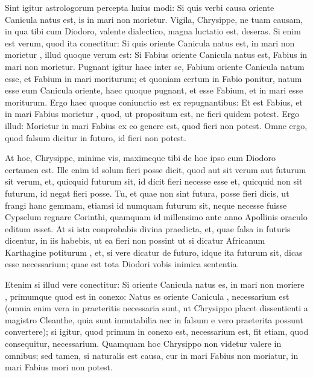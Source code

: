  Sint igitur astrologorum percepta huius modi: Si quis verbi causa oriente Canicula natus est, is in mari non morietur. Vigila, Chrysippe, ne tuam causam, in qua tibi cum Diodoro, valente dialectico, magna luctatio est, deseras. Si enim est verum, quod ita conectitur: Si quis oriente Canicula natus est, in mari non morietur , illud quoque verum est: Si Fabius oriente Canicula natus est, Fabius in mari non morietur. Pugnant igitur haec inter se, Fabium oriente Canicula natum esse, et Fabium in mari moriturum; et quoniam certum in Fabio ponitur, natum esse eum Canicula oriente, haec quoque pugnant, et esse Fabium, et in mari esse moriturum. Ergo haec quoque coniunctio est ex repugnantibus: Et est Fabius, et in mari Fabius morietur , quod, ut propositum est, ne fieri quidem potest. Ergo illud: Morietur in mari Fabius ex eo genere est, quod fieri non potest. Omne ergo, quod falsum dicitur in futuro, id fieri non potest.

 At hoc, Chrysippe, minime vis, maximeque tibi de hoc ipso cum Diodoro certamen est. Ille enim id solum fieri posse dicit, quod aut sit verum aut futurum sit verum, et, quicquid futurum sit, id dicit fieri necesse esse et, quicquid non sit futurum, id negat fieri posse. Tu, et quae non sint futura, posse fieri dicis, ut frangi hanc gemmam, etiamsi id numquam futurum sit, neque necesse fuisse Cypselum regnare Corinthi, quamquam id millensimo ante anno Apollinis oraculo editum esset. At si ista conprobabis divina praedicta, et, quae falsa in futuris dicentur, in iis habebis, ut ea fieri non possint ut si dicatur Africanum Karthagine potiturum , et, si vere dicatur de futuro, idque ita futurum sit, dicas esse necessarium; quae est tota Diodori vobis inimica sententia.

 Etenim si illud vere conectitur: Si oriente Canicula natus es, in mari non moriere , primumque quod est in conexo: Natus es oriente Canicula , necessarium est (omnia enim vera in praeteritis necessaria sunt, ut Chrysippo placet dissentienti a magistro Cleanthe, quia sunt inmutabilia nec in falsum e vero praeterita possunt convertere); si igitur, quod primum in conexo est, necessarium est, fit etiam, quod consequitur, necessarium. Quamquam hoc Chrysippo non videtur valere in omnibus; sed tamen, si naturalis est causa, cur in mari Fabius non moriatur, in mari Fabius mori non potest.

